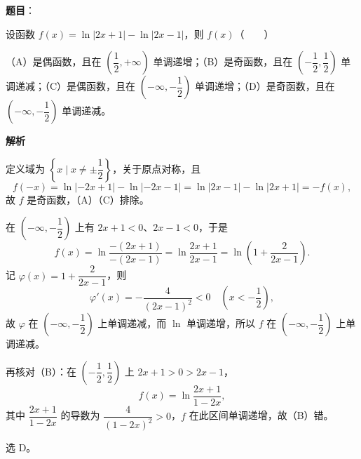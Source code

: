 \begin{answer}

\textbf{题目}：

设函数 $f(x)=\ln|2x+1|-\ln|2x-1|$，则 $f(x)$\mbox{（　　）}

（A）是偶函数，且在 $\left(\dfrac12,+\infty\right)$ 单调递增；（B）是奇函数，且在 $\left(-\dfrac12,\dfrac12\right)$ 单调递减；（C）是偶函数，且在 $\left(-\infty,-\dfrac12\right)$ 单调递增；（D）是奇函数，且在 $\left(-\infty,-\dfrac12\right)$ 单调递减。

\textbf{解析}

定义域为 $\left\{x\mid x\neq\pm\dfrac12\right\}$，关于原点对称，且
\nopagebreak[4]
\[f(-x)=\ln|-2x+1|-\ln|-2x-1|=\ln|2x-1|-\ln|2x+1|=-f(x),\]
故 $f$ 是奇函数，（A）（C）排除。

在 $\left(-\infty,-\dfrac12\right)$ 上有 $2x+1<0$、$2x-1<0$，于是
\nopagebreak[4]
\[f(x)=\ln\frac{-(2x+1)}{-(2x-1)}=\ln\frac{2x+1}{2x-1}
=\ln\left(1+\frac{2}{2x-1}\right).\]
记 $\varphi(x)=1+\dfrac{2}{2x-1}$，则
\nopagebreak[4]
\[\varphi'(x)=-\frac{4}{(2x-1)^2}<0\quad\left(x<-\frac12\right),\]
故 $\varphi$ 在 $\left(-\infty,-\dfrac12\right)$ 上单调递减，而 $\ln$ 单调递增，所以 $f$ 在 $\left(-\infty,-\dfrac12\right)$ 上单调递减。

再核对（B）：在 $\left(-\dfrac12,\dfrac12\right)$ 上 $2x+1>0>2x-1$，
\nopagebreak[4]
\[f(x)=\ln\frac{2x+1}{1-2x},\]
其中 $\dfrac{2x+1}{1-2x}$ 的导数为 $\dfrac{4}{(1-2x)^2}>0$，$f$ 在此区间单调递增，故（B）错。

选 D。


\end{answer}
